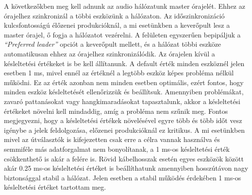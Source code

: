 A következőkben meg kell adnunk az audio hálózatunk master órajelét. Ehhez az órajelhez
szinkronizál a többi eszközünk a hálózaton.
Az időszinkronizáció kulcsfontosságú élőzenei produkcióknál,
a mi esetünkben a keverőpult lesz a master órajel, ő fogja a hálózatot
vezérelni. A felületen egyszerűen bepipáljuk a \textit{``Preferred leader''} opciót
a keverőpult mellett, és a hálózat többi eszköze automatikusan ehhez az órajelhez szinkronizálódik.
Az órajelen kívül a késleltetési értékeket is be kell állítanunk. A default érték minden eszköznél jelen esetben
1 ms, mivel ennél az értéknél a legtöbb eszköz képes probléma nélkül működni. Ez az érték azonban
nem minden esetben optimális, ezért fontos, hogy minden eszköz késleltetését ellenőrizzük és beállítsuk.
Amennyiben problémákat, zavaró pattanásokat vagy hangkimaradásokat tapasztalunk, akkor a késleltetési értékeket
növelni kell mindaddig, amíg a probléma nem szűnik meg. Fontos megjegyezni, hogy a késleltetési értékek
növelésével egyre több és több időt vesz igénybe a jelek feldolgozása, előzenei produkcióknál ez kritikus.
A mi esetünkben mivel az útválasztók is kifejezetten csak erre a célra vannak használva és semmiféle más
adatforgalmat nem bonyolítanak, a 1 ms-os késleltetési érték csökkenthető is akár a felére is.
Rövid kábelhosszak esetén egyes eszközök között akár 0.25 ms-os késleltetési értéket is beállíthatunk amennyiben
hosszútávon nagy biztonsággal stabil a hálózat. Jelen esetben a stabil működés érdekében 1 ms-os késleltetési értéket
tartottam meg.
